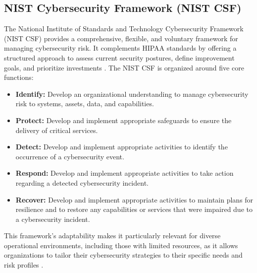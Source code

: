 \documentclass[12pt, a4paper, oneside]{report}
\begin{document}
	\subsection{NIST Cybersecurity Framework (NIST CSF)}
	The National Institute of Standards and Technology Cybersecurity Framework (NIST CSF) provides a comprehensive, flexible, and voluntary framework for managing cybersecurity risk. It complements HIPAA standards by offering a structured approach to assess current security postures, define improvement goals, and prioritize investments \cite{rahmany2026aida}. The NIST CSF is organized around five core functions:
	\begin{itemize}
		\item \textbf{Identify:} Develop an organizational understanding to manage cybersecurity risk to systems, assets, data, and capabilities.
		\item \textbf{Protect:} Develop and implement appropriate safeguards to ensure the delivery of critical services.
		\item \textbf{Detect:} Develop and implement appropriate activities to identify the occurrence of a cybersecurity event.
		\item \textbf{Respond:} Develop and implement appropriate activities to take action regarding a detected cybersecurity incident.
		\item \textbf{Recover:} Develop and implement appropriate activities to maintain plans for resilience and to restore any capabilities or services that were impaired due to a cybersecurity incident.
	\end{itemize}
	This framework's adaptability makes it particularly relevant for diverse operational environments, including those with limited resources, as it allows organizations to tailor their cybersecurity strategies to their specific needs and risk profiles \cite{rahmany2026aida}.
	
\end{document}
